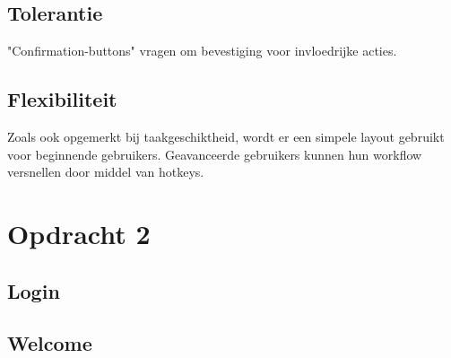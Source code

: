 \documentclass[11pt,english]{article}
\begin{document}
  \subsection{Tolerantie}
  "Confirmation-buttons" vragen om bevestiging voor invloedrijke acties.

  \subsection{Flexibiliteit}
  Zoals ook opgemerkt bij taakgeschiktheid, wordt er een simpele layout gebruikt
  voor beginnende gebruikers. Geavanceerde gebruikers kunnen hun workflow
  versnellen door middel van hotkeys.

  \section{Opdracht 2}
  \subsection{Login}
  \begin{center}
  \end{center}

  \subsection{Welcome}
  \begin{center}
  \end{center}
\end{document}

